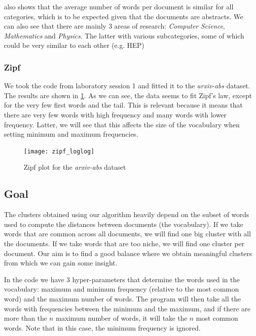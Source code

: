  also shows that the average number of words per document is similar for
all categories, which is to be expected given that the documents are abstracts. We can also see that
there are mainly 3 areas of research: \emph{Computer Science}, \emph{Mathematics} and \emph{Physics}.
The latter with various subcategories, some of which could be very similar to each other (e.g. HEP)

\subsubsection{Zipf}

We took the code from laboratory session 1 and fitted it to the \emph{arxiv-abs} dataset. The results
are shown in \cref{fig:zipf}. As we can see, the data seems to fit Zipf's law, except for the very
few first words and the tail. This is relevant because it means that there are very few words
with high frequency and many words with lower frequency. Latter, we will see that this affects the
size of the vocabulary when setting minimum and maximum frequencies.

\begin{figure}[H]
    \texttt{[image: zipf\_loglog]}%
    \label{fig:zipf}
    \caption{Zipf plot for the \emph{arxiv-abs} dataset}
\end{figure}

\subsection{Goal}

The clusters obtained using our algorithm heavily depend on the subset of words used to compute
the distances between documents (the vocabulary). If we take words that are common
across all documents, we will find one big cluster with all the documents. If we take words that are
too niche, we will find one cluster per document. Our aim is to find a good balance where
we obtain meaningful clusters from which we can gain some insight.

In the code we have 3 hyper-parameters that determine the words used in the vocabulary:
maximum and minimum frequency (relative to the most common word) and the maximum number
of words. The program will then take all the words with frequencies between the minimum and
the maximum, and if there are more than the $n$ maximum number of words, it will take the $n$
most common words. Note that in this case, the minimum frequency is ignored.

